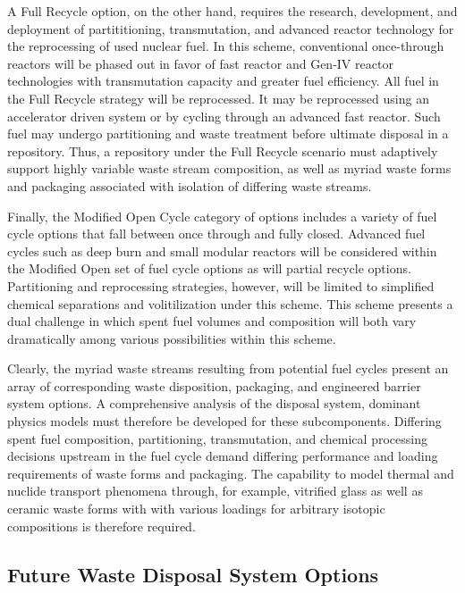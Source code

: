 A Full Recycle option, on the other hand, requires the research, 
development, and deployment of partititioning, transmutation, and 
advanced reactor technology for the reprocessing of used nuclear fuel.  
In this scheme, conventional once-through reactors will be phased out 
in favor of fast reactor and Gen-IV reactor technologies with 
transmutation capacity and greater fuel efficiency. All fuel in the 
Full Recycle strategy will be reprocessed. It may be reprocessed using  
an accelerator driven system or by cycling through an advanced fast 
reactor. Such fuel may undergo partitioning and waste treatment before 
ultimate disposal in a repository. Thus, a repository under the Full 
Recycle scenario must adaptively support highly variable waste stream 
composition, as well as myriad waste forms and packaging associated 
with isolation of differing waste streams.

Finally, the Modified Open Cycle category of options includes a 
variety of fuel cycle options that fall between once through and fully 
closed. Advanced fuel cycles such as deep burn and small modular 
reactors will be considered within the Modified Open set of fuel cycle 
options as will partial recycle options. Partitioning and reprocessing 
strategies, however, will be limited to simplified chemical 
separations and volitilization under this scheme. This scheme presents
a dual challenge in which spent fuel volumes and composition will both 
vary dramatically among various possibilities within this scheme.  
\cite{department_of_energy_-_nuclear_energy_nuclear_2010} 

Clearly, the myriad waste streams resulting from potential fuel cycles 
present an array of corresponding waste disposition, packaging, and 
engineered barrier system options. A comprehensive analysis of the 
disposal system, dominant physics models must therefore be developed 
for these subcomponents.  Differing spent fuel composition, 
partitioning, transmutation, and chemical processing decisions 
upstream in the fuel cycle demand differing performance and loading 
requirements of waste forms and packaging. The capability to model 
thermal and nuclide transport phenomena through, for example, 
vitrified glass as well as ceramic waste forms with with various 
loadings for arbitrary isotopic compositions is therefore required.  

\subsection{Future Waste Disposal System Options}


